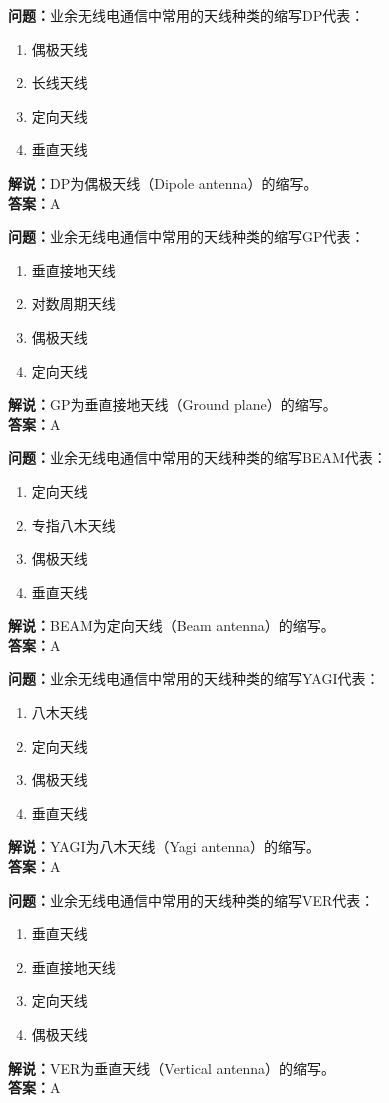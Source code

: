 \documentclass[UTF8]{ctexbook}
\begin{document}
\textbf{问题：}业余无线电通信中常用的天线种类的缩写DP代表：
\begin{enumerate}[label=\Alph*), leftmargin=3em]
  \item 偶极天线
  \item 长线天线
  \item 定向天线
  \item 垂直天线
\end{enumerate}
\textbf{解说：}DP为偶极天线（Dipole antenna）的缩写。\\
\textbf{答案：}A

\textbf{问题：}业余无线电通信中常用的天线种类的缩写GP代表：
\begin{enumerate}[label=\Alph*), leftmargin=3em]
  \item 垂直接地天线
  \item 对数周期天线
  \item 偶极天线
  \item 定向天线
\end{enumerate}
\textbf{解说：}GP为垂直接地天线（Ground plane）的缩写。\\
\textbf{答案：}A

\textbf{问题：}业余无线电通信中常用的天线种类的缩写BEAM代表：
\begin{enumerate}[label=\Alph*), leftmargin=3em]
  \item 定向天线
  \item 专指八木天线
  \item 偶极天线
  \item 垂直天线
\end{enumerate}
\textbf{解说：}BEAM为定向天线（Beam antenna）的缩写。\\
\textbf{答案：}A

\textbf{问题：}业余无线电通信中常用的天线种类的缩写YAGI代表：
\begin{enumerate}[label=\Alph*), leftmargin=3em]
  \item 八木天线
  \item 定向天线
  \item 偶极天线
  \item 垂直天线
\end{enumerate}
\textbf{解说：}YAGI为八木天线（Yagi antenna）的缩写。\\
\textbf{答案：}A

\textbf{问题：}业余无线电通信中常用的天线种类的缩写VER代表：
\begin{enumerate}[label=\Alph*), leftmargin=3em]
  \item 垂直天线
  \item 垂直接地天线
  \item 定向天线
  \item 偶极天线
\end{enumerate}
\textbf{解说：}VER为垂直天线（Vertical antenna）的缩写。\\
\textbf{答案：}A
\end{document}
